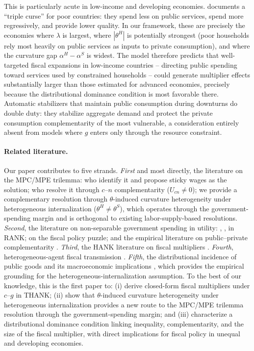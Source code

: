 \smallskip
This is particularly acute in low-income and developing economies.
\citet{Gethin2023} documents a ``triple curse'' for poor countries: they spend
less on public services, spend more regressively, and provide lower quality.
In our framework, these are precisely the economies where $\lambda$ is largest,
where $|\theta^{H}|$ is potentially strongest (poor households rely most heavily
on public services as inputs to private consumption), and where the curvature
gap $\alpha^{H}-\alpha^{S}$ is widest. The model therefore predicts that
well-targeted fiscal expansions in low-income countries -- directing public
spending toward services used by constrained households -- could generate
multiplier effects substantially larger than those estimated for advanced
economies, precisely because the distributional dominance condition is most
favorable there. Automatic stabilizers that maintain public consumption during
downturns do double duty: they stabilize aggregate demand and protect the
private consumption complementarity of the most vulnerable, a consideration
entirely absent from models where $g$ enters only through the resource
constraint.

\paragraph{Related literature.}
Our paper contributes to five strands. \emph{First} and most directly, the
literature on the MPC/MPE trilemma: \citet{Auclert2024} who identify it and
propose sticky wages as the solution; \BHL{} who resolve it through $c$--$n$
complementarity ($U_{cn}\neq 0$); we provide a complementary resolution through
$\theta$-induced curvature heterogeneity under heterogeneous internalization
($\theta^{H}\neq\theta^{S}$), which operates through the government-spending
margin and is orthogonal to existing labor-supply-based resolutions.
\emph{Second}, the literature on non-separable government spending in utility:
\citet{BouakezRebei2007}, \citet{LinnemannSchabert2006}, \citet{Feve2013} in
RANK; \citet{Bilbiie2011} on the fiscal policy puzzle; and the empirical
literature on public--private complementarity
\citep{Karras1994,JallesKarras2022,FrancoisKeinsley2023,FrancoisDawood2018,
Francois2023,BarthelFrancois2025}. \emph{Third}, the HANK literature on fiscal
multipliers \citep{KaplanMollViolante2018,Bilbiie2025,AuclertIKC2024,Broer2023}.
\emph{Fourth}, heterogeneous-agent fiscal transmission
\citep{Gali2007,OhReis2012,Hagedorn2019}. \emph{Fifth}, the distributional
incidence of public goods and its macroeconomic implications \citep{Gethin2023},
which provides the empirical grounding for the heterogeneous-internalization
assumption. To the best of our knowledge, this is the first paper to: (i) derive
closed-form fiscal multipliers under $c$--$g$ \EC{} in THANK; (ii) show that
$\theta$-induced curvature heterogeneity under heterogeneous internalization
provides a new route to the MPC/MPE trilemma resolution through the
government-spending margin; and (iii) characterize a distributional dominance
condition linking inequality, complementarity, and the size of the fiscal
multiplier, with direct implications for fiscal policy in unequal and
developing economies.

